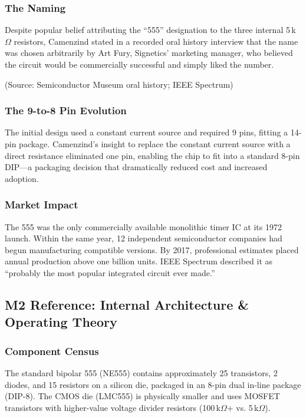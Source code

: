 \documentclass[11pt,letterpaper]{article}
\begin{document}
\subsubsection{The Naming}

Despite popular belief attributing the ``555'' designation to the three internal 5\,k$\Omega$ resistors, Camenzind stated in a recorded oral history interview that the name was chosen arbitrarily by Art Fury, Signetics' marketing manager, who believed the circuit would be commercially successful and simply liked the number.

(Source: Semiconductor Museum oral history; IEEE Spectrum)

\subsubsection{The 9-to-8 Pin Evolution}

The initial design used a constant current source and required 9 pins, fitting a 14-pin package. Camenzind's insight to replace the constant current source with a direct resistance eliminated one pin, enabling the chip to fit into a standard 8-pin DIP---a packaging decision that dramatically reduced cost and increased adoption.

\subsubsection{Market Impact}

The 555 was the only commercially available monolithic timer IC at its 1972 launch. Within the same year, 12 independent semiconductor companies had begun manufacturing compatible versions. By 2017, professional estimates placed annual production above one billion units. IEEE Spectrum described it as ``probably the most popular integrated circuit ever made.''

\subsection{M2 Reference: Internal Architecture \& Operating Theory}

\subsubsection{Component Census}

The standard bipolar 555 (NE555) contains approximately 25 transistors, 2 diodes, and 15 resistors on a silicon die, packaged in an 8-pin dual in-line package (DIP-8). The CMOS die (LMC555) is physically smaller and uses MOSFET transistors with higher-value voltage divider resistors (100\,k$\Omega$+ vs. 5\,k$\Omega$).
\end{document}

